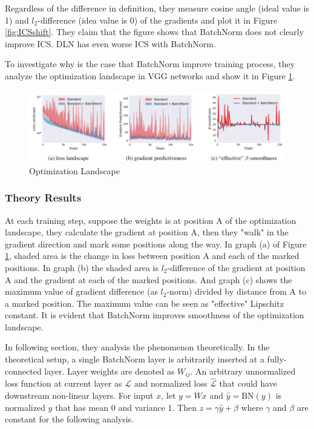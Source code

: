 \documentclass{article}
\begin{document}
Regardless of the difference in definition, they measure cosine angle (ideal value is 1) and $l_2$-difference (idea value is 0) of the gradients and plot it in Figure \ref{fig:ICSshift}. They claim that the figure shows that BatchNorm does not clearly improve ICS. DLN has even worse ICS with BatchNorm.

To investigate why is the case that BatchNorm improve training process, they analyze the optimization landscape in VGG networks and show it in Figure \ref{fig:optimizationlandscape}.
\begin{figure}[!ht]
	\centering
    \includegraphics[width=\textwidth]{pics/batchNorm/Santurkar_fig4.jpg}
	\caption{Optimization Landscape}
	\label{fig:optimizationlandscape}
\end{figure}

\subsubsection{Theory Results}

At each training step, suppose the weights is at position A of the optimization landscape, they calculate the gradient at position A, then they "walk" in the gradient direction and mark some positions along the way. In graph (a) of Figure \ref{fig:optimizationlandscape}, shaded area is the change in loss between position A and each of the marked positions. In graph (b) the shaded area is $l_2$-difference of the gradient at position A and the gradient at each of the marked positions. And graph (c) shows the maximum value of gradient difference (as $l_2$-norm) divided by distance from A to a marked position. The maximum value can be seen as "effective" Lipschitz constant. It is evident that BatchNorm improves smoothness of the optimization landscape.

In following section, they analysis the phenomenon theoretically. In the theoretical setup, a single BatchNorm layer is arbitrarily inserted at a fully-connected layer. Layer weights are denoted as $W_{ij}$. An arbitrary unnormalized loss function at current layer as $\mathcal{L}$ and normalized loss $\hat{\mathcal{L}}$ that could have downstream non-linear layers. For input $x$, let $y=Wx$ and $\hat{y}=\text{BN}(y)$ is normalized $y$ that has mean 0 and variance 1. Then $z=\gamma\hat{y}+\beta$ where $\gamma$ and $\beta$ are constant for the following analysis. 
\end{document}
